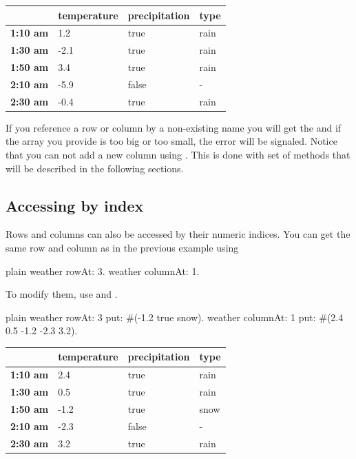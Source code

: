\documentclass[10pt,twoside,english]{_support/latex/sbabook/sbabook}
\begin{document}
\begin{tabular}{llll}
\toprule
 & \textbf{temperature} & \textbf{precipitation} & \textbf{type} \\
\midrule
\textbf{1:10 am} & 1.2 & true & rain \\
\textbf{1:30 am} & -2.1 & true & rain \\
\textbf{1:50 am} & 3.4 & true & rain \\
\textbf{2:10 am} & -5.9 & false & - \\
\textbf{2:30 am} & -0.4 & true & rain \\
\bottomrule
\end{tabular}

If you reference a row or column by a non-existing name you will get the  and if the array you provide is too big or too small, the  error will be signaled. Notice that you can not add a new column using . This is done with  set of methods that will be described in the following sections.
\subsection{Accessing by index}
Rows and columns can also be accessed by their numeric indices. You can get the same row and column as in the previous example using

\begin{displaycode}{plain}
weather rowAt: 3.
weather columnAt: 1.
\end{displaycode}

To modify them, use  and .

\begin{displaycode}{plain}
weather rowAt: 3 put: #(-1.2 true snow).
weather columnAt: 1 put: #(2.4 0.5 -1.2 -2.3 3.2).
\end{displaycode}

\begin{tabular}{llll}
\toprule
 & \textbf{temperature} & \textbf{precipitation} & \textbf{type} \\
\midrule
\textbf{1:10 am} & 2.4 & true & rain \\
\textbf{1:30 am} & 0.5 & true & rain \\
\textbf{1:50 am} & -1.2 & true & snow \\
\textbf{2:10 am} & -2.3 & false & - \\
\textbf{2:30 am} & 3.2 & true & rain \\
\bottomrule
\end{tabular}
\end{document}
